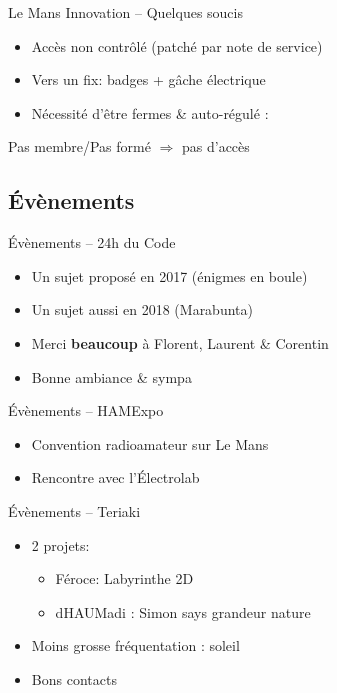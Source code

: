 \documentclass[10pt]{beamer}
\begin{document}
\begin{frame}{Le Mans Innovation -- Quelques soucis}
	\begin{itemize}
		\item Accès non contrôlé (patché par note de service)
		\item Vers un fix: badges + gâche électrique
		\item Nécessité d'être fermes \& auto-régulé :
	\end{itemize}

	\pause
	\begin{center}
		Pas membre/Pas formé $\Rightarrow$ pas d'accès
	\end{center}
\end{frame}

\subsection{Évènements}

\begin{frame}{Évènements -- 24h du Code}
	\begin{itemize}
		\item Un sujet proposé en 2017 (énigmes en boule)
		\item Un sujet aussi en 2018 (Marabunta)
		\item Merci \textbf{beaucoup} à Florent, Laurent \& Corentin
		\item Bonne ambiance \& sympa
	\end{itemize}
\end{frame}

\begin{frame}{Évènements -- HAMExpo}
	\begin{itemize}
		\item Convention radioamateur sur Le Mans
		\item Rencontre avec l'Électrolab
	\end{itemize}
\end{frame}

\begin{frame}{Évènements -- Teriaki}
	\begin{itemize}
		\item 2 projets:
			\begin{itemize}
				\item Féroce: Labyrinthe 2D
				\item dHAUMadi : Simon says grandeur nature
			\end{itemize}
		\item Moins grosse fréquentation : soleil
		\item Bons contacts
	\end{itemize}
\end{frame}
\end{document}
